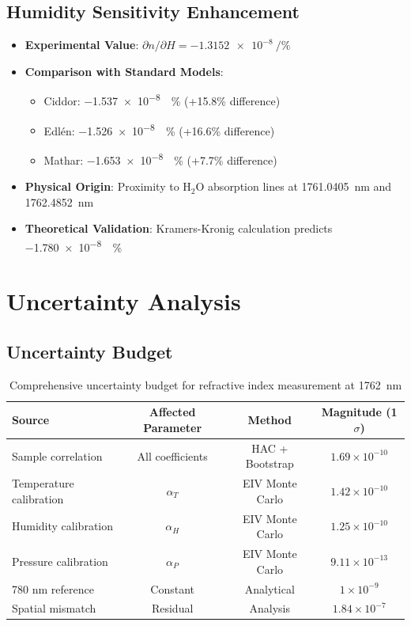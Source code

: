 \documentclass[aip,reprint,groupedaddress,onecolumn,superscriptaddress]{revtex4-2}
\begin{document}
\subsection{Humidity Sensitivity Enhancement}
\begin{itemize}
    \item \textbf{Experimental Value}: $\partial n/\partial H = \SI{-1.3152e-8}{\per\percent}$
    \item \textbf{Comparison with Standard Models}:
    \begin{itemize}
        \item Ciddor\cite{ciddor1996refractive}: \SI{-1.537e-8}{\per\percent} (+15.8\% difference)
        \item Edlén\cite{edlen1966refractive}: \SI{-1.526e-8}{\per\percent} (+16.6\% difference)  
        \item Mathar\cite{mathar2007refractive}: \SI{-1.653e-8}{\per\percent} (+7.7\% difference)
    \end{itemize}
    \item \textbf{Physical Origin}: Proximity to H$_2$O absorption lines at \SI{1761.0405}{\nano\meter} and \SI{1762.4852}{\nano\meter}\cite{kochanov2016hitran,gordon2022hitran2020}
    \item \textbf{Theoretical Validation}: Kramers-Kronig calculation predicts \SI{-1.780e-8}{\per\percent}
\end{itemize}

\section{Uncertainty Analysis}

\subsection{Uncertainty Budget}
\begin{table}[ht]
\centering
\caption{Comprehensive uncertainty budget for refractive index measurement at \SI{1762}{\nano\meter}}
\begin{tabular}{lccc}
\toprule
\textbf{Source} & \textbf{Affected Parameter} & \textbf{Method} & \textbf{Magnitude (1$\sigma$)} \\
\midrule
Sample correlation & All coefficients & HAC + Bootstrap & $1.69 \times 10^{-10}$ \\
Temperature calibration & $\alpha_T$ & EIV Monte Carlo & $1.42 \times 10^{-10}$ \\
Humidity calibration & $\alpha_H$ & EIV Monte Carlo & $1.25 \times 10^{-10}$ \\
Pressure calibration & $\alpha_P$ & EIV Monte Carlo & $9.11 \times 10^{-13}$ \\
780 nm reference & Constant & Analytical & $1 \times 10^{-9}$ \\
Spatial mismatch & Residual & Analysis & $1.84 \times 10^{-7}$ \\
\bottomrule
\end{tabular}
\label{tab:uncertainty_budget}
\end{table}
\end{document}
